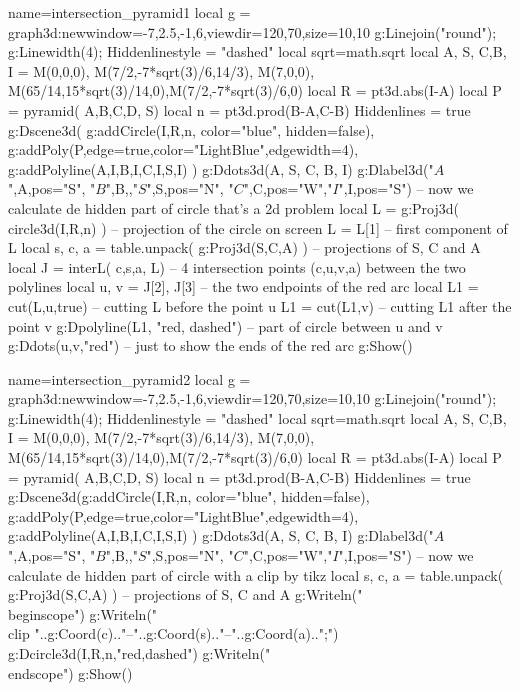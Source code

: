 \documentclass[12pt]{standalone}
\begin{document}

\begin{luadraw}{name=intersection_pyramid1}
local g = graph3d:new{window={-7,2.5,-1,6},viewdir={120,70},size={10,10}}
g:Linejoin("round"); g:Linewidth(4); Hiddenlinestyle = "dashed"
local sqrt=math.sqrt
local A, S,  C,B, I  = M(0,0,0), M(7/2,-7*sqrt(3)/6,14/3), M(7,0,0), M(65/14,15*sqrt(3)/14,0),M(7/2,-7*sqrt(3)/6,0)
local R = pt3d.abs(I-A)
local P = pyramid( {A,B,C,D}, S)
local n = pt3d.prod(B-A,C-B)
Hiddenlines = true 
g:Dscene3d(
g:addCircle(I,R,n, {color="blue", hidden=false}),
g:addPoly(P,{edge=true,color="LightBlue",edgewidth=4}),
g:addPolyline({{A,I},{B,I},{C,I},{S,I}})
)
g:Ddots3d({A, S,  C, B, I}) 
g:Dlabel3d("$A$",A,{pos="S"}, "$B$",B,{},"$S$",S,{pos="N"}, "$C$",C,{pos="W"},"$I$",I,{pos="S"}) 
-- now we calculate de hidden part of circle that's a 2d problem
local L = g:Proj3d( circle3d(I,R,n) ) -- projection of the circle on screen
L = L[1] -- first component of L
local s, c, a = table.unpack( g:Proj3d({S,C,A}) ) -- projections of S, C and A
local J = interL( {c,s,a}, L) -- 4 intersection points (c,u,v,a) between the two polylines
local u, v = J[2], J[3] -- the two endpoints of the red arc
local L1 = cut(L,u,true) -- cutting L before the point u
L1 = cut(L1,v) -- cutting L1 after the point v
g:Dpolyline(L1, "red, dashed") -- part of circle between u and v
g:Ddots({u,v},"red") -- just to show the ends of the red arc
g:Show()
\end{luadraw}

\begin{luadraw}{name=intersection_pyramid2}
local g = graph3d:new{window={-7,2.5,-1,6},viewdir={120,70},size={10,10}}
g:Linejoin("round"); g:Linewidth(4); Hiddenlinestyle = "dashed"
local sqrt=math.sqrt
local A, S,  C,B, I  = M(0,0,0), M(7/2,-7*sqrt(3)/6,14/3), M(7,0,0), M(65/14,15*sqrt(3)/14,0),M(7/2,-7*sqrt(3)/6,0)
local R = pt3d.abs(I-A)
local P = pyramid( {A,B,C,D}, S)
local n = pt3d.prod(B-A,C-B)
Hiddenlines = true 
g:Dscene3d(g:addCircle(I,R,n, {color="blue", hidden=false}),
g:addPoly(P,{edge=true,color="LightBlue",edgewidth=4}),
g:addPolyline({{A,I},{B,I},{C,I},{S,I}})
)
g:Ddots3d({A, S,  C, B, I}) 
g:Dlabel3d("$A$",A,{pos="S"}, "$B$",B,{},"$S$",S,{pos="N"}, "$C$",C,{pos="W"},"$I$",I,{pos="S"}) 
-- now we calculate de hidden part of circle with a clip by tikz
local s, c, a = table.unpack( g:Proj3d({S,C,A}) ) -- projections of S, C and A
g:Writeln("\\begin{scope}")
g:Writeln("\\clip "..g:Coord(c).."--"..g:Coord(s).."--"..g:Coord(a)..";")
g:Dcircle3d(I,R,n,"red,dashed")
g:Writeln("\\end{scope}")
g:Show()
\end{luadraw}
\end{document}

